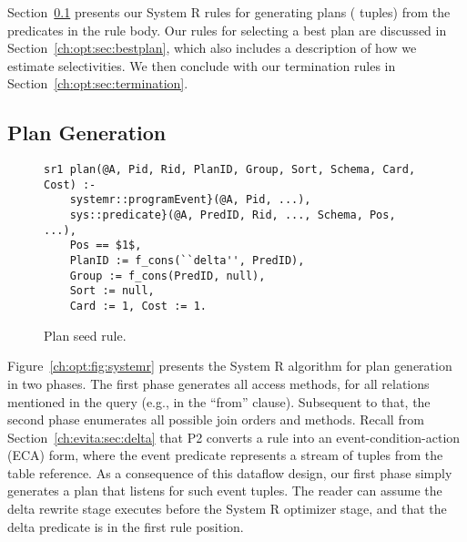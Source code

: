 Section~\ref{ch:opt:sec:plangen} presents our System R rules for generating
plans ( tuples) from the predicates in the rule body.  Our rules for
selecting a best plan are discussed in Section~\ref{ch:opt:sec:bestplan}, which
also includes a description of how we estimate selectivities.  We then conclude
with our termination rules in Section~\ref{ch:opt:sec:termination}.

\subsection{Plan Generation}
\label{ch:opt:sec:plangen}

\begin{figure*}
\ssp
\centering
\begin{lstlisting}
sr1 plan(@A, Pid, Rid, PlanID, Group, Sort, Schema, Card, Cost) :-
    systemr::programEvent}(@A, Pid, ...),
    sys::predicate}(@A, PredID, Rid, ..., Schema, Pos, ...),
    Pos == $1$,
    PlanID := f_cons(``delta'', PredID),
    Group := f_cons(PredID, null),
    Sort := null,
    Card := 1, Cost := 1.
\end{lstlisting}
\caption{\label{ch:opt:fig:planseed}Plan seed rule.}
\end{figure*}

Figure~\ref{ch:opt:fig:systemr} presents the System R algorithm for plan
generation in two phases.  The first phase generates all access methods, for all
relations mentioned in the query (e.g., in the ``from'' clause).  Subsequent to
that, the second phase enumerates all possible join orders and methods.  Recall
from Section~\ref{ch:evita:sec:delta} that P2 converts a rule into an
event-condition-action (ECA) form, where the event predicate represents a
stream of tuples from the table reference.  As a consequence of this dataflow
design, our first phase simply generates a plan that listens for such event
tuples.  The reader can assume the delta rewrite stage executes before the
System R optimizer stage, and that the delta predicate is in the first rule
position.  

